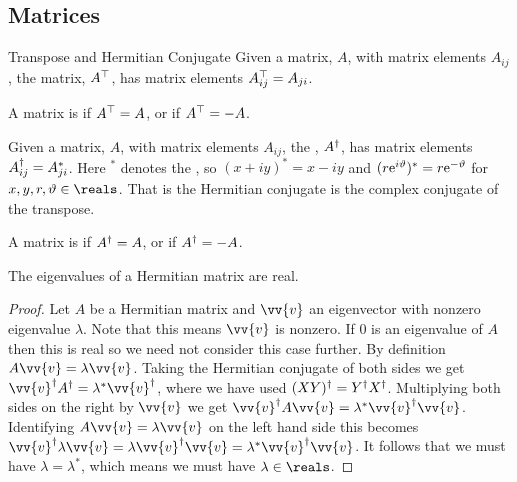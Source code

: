 \subsection{Matrices}
\begin{dfn}{Transpose and Hermitian Conjugate}{}
    Given a matrix, \(A\), with matrix elements \(A_{ij}\), the  matrix, \(A^\top\), has matrix elements \(A^\top_{ij} = A_{ji}\).
    
    A matrix is  if \(A^\top = A\), or  if \(A^\top = -A\).
    
    Given a matrix, \(A\), with matrix elements \(A_{ij}\), the , \(A^\dagger\), has matrix elements \(A^\dagger_{ij} = A_{ji}^*\).
    Here \(^*\) denotes the , so \((x + iy)^* = x - iy\) and \((r\mathrm{e}^{i\vartheta})^* = r\mathrm{e}^{-\vartheta}\) for \(x, y, r, \vartheta \in \reals\).
    That is the Hermitian conjugate is the complex conjugate of the transpose.
    
    A matrix is  if \(A^\dagger = A\), or  if \(A^\dagger = -A\).
\end{dfn}

\begin{lma}{}{}
    The eigenvalues of a Hermitian matrix are real.
    \begin{proof}
        Let \(A\) be a Hermitian matrix and \(\vv{v}\) an eigenvector with nonzero eigenvalue \(\lambda\).
        Note that this means \(\vv{v}\) is nonzero.
        If \(0\) is an eigenvalue of \(A\) then this is real so we need not consider this case further.
        By definition \(A\vv{v} = \lambda\vv{v}\).
        Taking the Hermitian conjugate of both sides we get \(\vv{v}^\hermit A^\hermit = \lambda^*\vv{v}^\hermit\), where we have used \((XY)^\dagger = Y^\dagger X^\dagger\).
        Multiplying both sides on the right by \(\vv{v}\) we get \(\vv{v}^\hermit A \vv{v} = \lambda^*\vv{v}^\hermit \vv{v}\).
        Identifying \(A\vv{v} = \lambda\vv{v}\) on the left hand side this becomes \(\vv{v}^\hermit \lambda \vv{v} = \lambda\vv{v}^\hermit \vv{v} = \lambda^*\vv{v}^\hermit \vv{v}\).
        It follows that we must have \(\lambda = \lambda^*\), which means we must have \(\lambda \in \reals\).
    \end{proof}
\end{lma}

